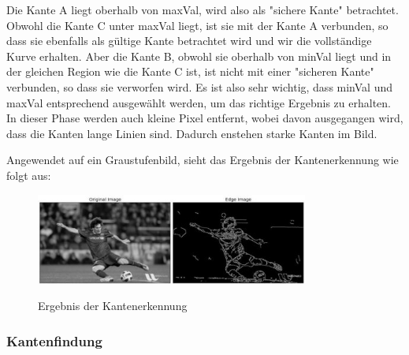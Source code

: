 \begin{compactenum}
\begin{compactenum}
\begin{figure}[H]
            \cite{hysteresisPic}
            \label{fig:anpr:edge:hysteresis}
            \end{figure}
            Die Kante A liegt oberhalb von maxVal, wird also als "sichere Kante" betrachtet. Obwohl die Kante C unter maxVal liegt, ist sie mit der Kante A verbunden, so dass sie ebenfalls als gültige Kante betrachtet wird und wir die vollständige Kurve erhalten. Aber die Kante B, obwohl sie oberhalb von minVal liegt und in der gleichen Region wie die Kante C ist, ist nicht mit einer "sicheren Kante" verbunden, so dass sie verworfen wird. Es ist also sehr wichtig, dass minVal und maxVal entsprechend ausgewählt werden, um das richtige Ergebnis zu erhalten.
            In dieser Phase werden auch kleine Pixel entfernt, wobei davon ausgegangen wird, dass die Kanten lange Linien sind. Dadurch enstehen starke Kanten im Bild.
    \end{compactenum}
\end{compactenum}
Angewendet auf ein Graustufenbild, sieht das Ergebnis der Kantenerkennung wie folgt aus:
\begin{figure}[H]
    \centering
    \includegraphics[width=0.8\textwidth]{pics/canny1.jpg}
    \caption{Ergebnis der Kantenerkennung}
    \cite{CannyPic}
    \label{fig:anpr:edge:canny}
    \end{figure}
\subsubsection{Kantenfindung}
